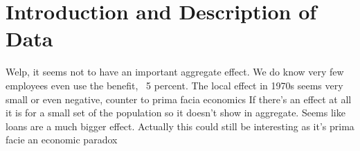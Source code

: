 \documentclass[review]{elsarticle}
\begin{document}
\pagebreak
\linenumbers
        
        \section{Introduction and Description of Data}







        Welp, it seems not to have an important aggregate effect.
        We do know very few employees even use the benefit, ~5 percent.
        The local effect in 1970s seems very small or even negative, counter to prima facia economics
        If there's an effect at all it is for a small set of the population so it doesn't show in aggregate.
        Seems like loans are a much bigger effect.
        Actually this could still be interesting as it's prima facie an economic paradox
\end{document}
